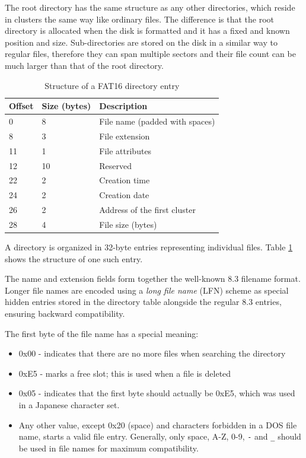 The root directory has the same structure as any other directories, which reside in clusters the same way like ordinary files. The difference is that the root directory is allocated when the disk is formatted and it has a fixed and known position and size. Sub-directories are stored on the disk in a similar way to regular files, therefore they can span multiple sectors and their file count can be much larger than that of the root directory.

\begin{table}
	\centering
	\begin{tabular}{lll}
		\toprule
		\textbf{Offset} & \textbf{Size (bytes)}  & \textbf{Description}\\
		\midrule
		0 & 8 & File name (padded with spaces) \\
		8 & 3 & File extension \\
		11 & 1 & File attributes \\
		12 & 10 & Reserved \\
		22 & 2 & Creation time \\
		24 & 2 & Creation date \\
		26 & 2 & Address of the first cluster \\
		28 & 4 & File size (bytes) \\
		\bottomrule
	\end{tabular}
	\caption{\label{tab:fat16-dir-entry}Structure of a FAT16 directory entry}
\end{table}

A directory is organized in 32-byte entries representing individual files. Table \ref{tab:fat16-dir-entry} shows the structure of one such entry.

The name and extension fields form together the well-known 8.3 filename format. Longer file names are encoded using a \textit{long file name} (LFN) scheme as special hidden entries stored in the directory table alongside the regular 8.3 entries, ensuring backward compatibility. 

The first byte of the file name has a special meaning:

\begin{itemize}
	\item 0x00 - indicates that there are no more files when searching the directory
	\item 0xE5 - marks a free slot; this is used when a file is deleted
	\item 0x05 - indicates that the first byte should actually be 0xE5, which was used in a Japanese character set.
	\item Any other value, except 0x20 (space) and characters forbidden in a DOS file name, starts a valid file entry. Generally, only space, A-Z, 0-9, \verb|-| and \verb|_| should be used in file names for maximum compatibility.
\end{itemize}


